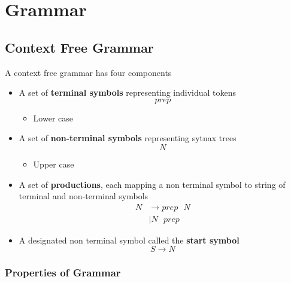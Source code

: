 \chapter{Grammar}

\section{Context Free Grammar}

  A context free grammar has four components

  \begin{itemize}
    \item A set of \textbf{terminal symbols} representing individual tokens
    \begin{equation*}
      prep
    \end{equation*}
    \begin{itemize}
      \item Lower case
    \end{itemize}

    \item A set of \textbf{non-terminal symbols} representing sytnax trees
    \begin{equation*}
      N
    \end{equation*}
    \begin{itemize}
      \item Upper case
    \end{itemize}

    \item A set of \textbf{productions}, each mapping a non terminal symbol
    to string of terminal and non-terminal symbols
    \begin{align*}
      N &\to prep \text{ } N \\
      &\left| N \text{ } prep \right.
    \end{align*}

    \item A designated non terminal symbol called the \textbf{start symbol}
    \begin{equation}
      S \to N
    \end{equation}
  \end{itemize}

  \subsection{Properties of Grammar}

